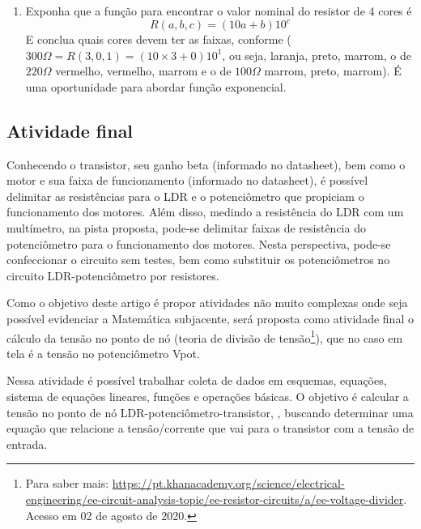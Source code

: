 \documentclass{textolivre}
\begin{document}
\begin{enumerate}
\item Exponha que a função para encontrar o valor nominal do resistor de 4 cores é
\begin{equation*}
R(a,b,c) = (10a + b)10^c
\end{equation*}
E conclua quais cores devem ter as faixas, conforme  ($300\Omega =
R(3,0,1)= (10 \times 3+0)10^1$, ou seja, laranja, preto, marrom, o de
$220\Omega$ vermelho, vermelho, marrom e o de $100\Omega$ marrom, preto,
marrom). É uma oportunidade para abordar função exponencial.




\end{enumerate}




\subsection{Atividade final}\label{sec-atv-final}
Conhecendo o transistor, seu ganho beta (informado no datasheet), bem como o
motor e sua faixa de funcionamento (informado no datasheet), é possível
delimitar as resistências para o LDR e o potenciômetro que propiciam o
funcionamento dos motores. Além disso, medindo a resistência do LDR com um
multímetro, na pista proposta, pode-se delimitar faixas de resistência do
potenciômetro para o funcionamento dos motores. Nesta perspectiva, pode-se
confeccionar o circuito sem testes, bem como substituir os potenciômetros no
circuito LDR-potenciômetro por resistores. 

Como o objetivo deste artigo é propor atividades não muito complexas onde seja
possível evidenciar a Matemática subjacente, será proposta como atividade final
o cálculo da tensão no ponto de nó (teoria de divisão de tensão\footnote{Para
saber mais:
\url{https://pt.khanacademy.org/science/electrical-engineering/ee-circuit-analysis-topic/ee-resistor-circuits/a/ee-voltage-divider}.
Acesso em 02 de agosto de 2020.}), que no caso em tela é a tensão no
potenciômetro Vpot.

Nessa atividade é possível trabalhar coleta de dados em esquemas, equações,
sistema de equações lineares, funções e operações básicas. O objetivo é
calcular a tensão no ponto de nó LDR-potenciômetro-transistor, ,
buscando determinar uma equação que relacione a tensão/corrente que vai para o
transistor com a tensão de entrada.
\end{document}
